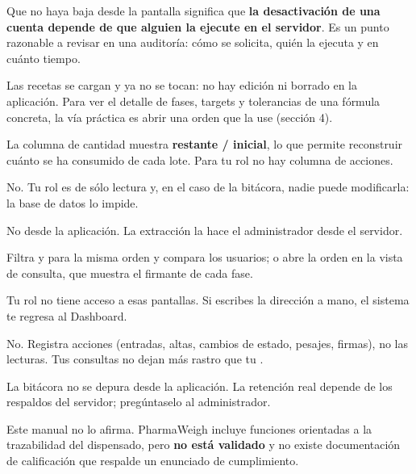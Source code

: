 \begin{cajaOjo}
Que no haya baja desde la pantalla significa que \textbf{la desactivación de una cuenta
depende de que alguien la ejecute en el servidor}. Es un punto razonable a revisar en
una auditoría: cómo se solicita, quién la ejecuta y en cuánto tiempo.
\end{cajaOjo}

\newpage
{}



\vspace{6pt}

Las recetas se cargan y ya no se tocan: no hay edición ni borrado en la aplicación.
Para ver el detalle de fases, targets y tolerancias de una fórmula concreta, la vía
práctica es abrir una orden que la use (sección 4).



\vspace{6pt}

La columna de cantidad muestra \textbf{restante / inicial}, lo que permite reconstruir
cuánto se ha consumido de cada lote. Para tu rol no hay columna de acciones.

\newpage
{}

No. Tu rol es de sólo lectura y, en el caso de la bitácora, nadie puede modificarla:
la base de datos lo impide.

No desde la aplicación. La extracción la hace el administrador desde el servidor.

Filtra  y  para la misma orden y compara los usuarios;
o abre la orden en la vista de consulta, que muestra el firmante de cada fase.

Tu rol no tiene acceso a esas pantallas. Si escribes la dirección a mano, el sistema
te regresa al Dashboard.

No. Registra acciones (entradas, altas, cambios de estado, pesajes, firmas), no las
lecturas. Tus consultas no dejan más rastro que tu .

La bitácora no se depura desde la aplicación. La retención real depende de los
respaldos del servidor; pregúntaselo al administrador.

Este manual no lo afirma. PharmaWeigh incluye funciones orientadas a la trazabilidad
del dispensado, pero \textbf{no está validado} y no existe documentación de
calificación que respalde un enunciado de cumplimiento.
